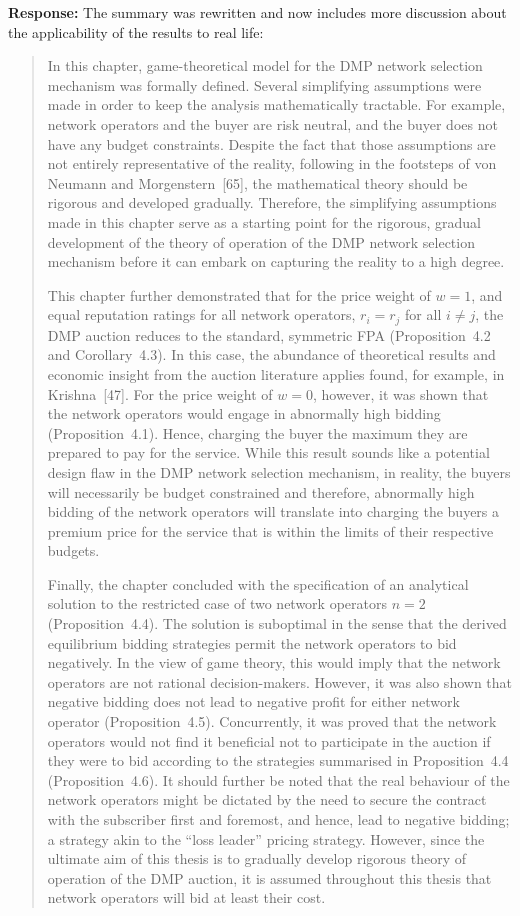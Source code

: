 \documentclass[10pt,a4paper,notitlepage]{article}
\numberwithin{equation}{section}
\begin{document}
\textbf{Response:}
The summary was rewritten and now includes more discussion about the applicability of the results to real life:
\begin{quote}
In this chapter, game-theoretical model for the DMP network selection mechanism was formally defined. Several simplifying assumptions were made in order to keep the analysis mathematically tractable. For example, network operators and the buyer are risk neutral, and the buyer does not have any budget constraints. Despite the fact that those assumptions are not entirely representative of the reality, following in the footsteps of von Neumann and Morgenstern~[65], the mathematical theory should be rigorous and developed gradually. Therefore, the simplifying assumptions made in this chapter serve as a starting point for the rigorous, gradual development of the theory of operation of the DMP network selection mechanism before it can embark on capturing the reality to a high degree.

This chapter further demonstrated that for the price weight of $w=1$, and equal reputation ratings for all network operators, $r_i=r_j$ for all $i\neq j$, the DMP auction reduces to the standard, symmetric FPA (Proposition~4.2 and Corollary~4.3). In this case, the abundance of theoretical results and economic insight from the auction literature applies found, for example, in Krishna~[47]. For the price weight of $w=0$, however, it was shown that the network operators would engage in abnormally high bidding (Proposition~4.1). Hence, charging the buyer the maximum they are prepared to pay for the service. While this result sounds like a potential design flaw in the DMP network selection mechanism, in reality, the buyers will necessarily be budget constrained and therefore, abnormally high bidding of the network operators will translate into charging the buyers a premium price for the service that is within the limits of their respective budgets.

Finally, the chapter concluded with the specification of an analytical solution to the restricted case of two network operators $n=2$ (Proposition~4.4). The solution is suboptimal in the sense that the derived equilibrium bidding strategies permit the network operators to bid negatively. In the view of game theory, this would imply that the network operators are not rational decision-makers. However, it was also shown that negative bidding does not lead to negative profit for either network operator (Proposition~4.5). Concurrently, it was proved that the network operators would not find it beneficial not to participate in the auction if they were to bid according to the strategies summarised in Proposition~4.4 (Proposition~4.6). It should further be noted that the real behaviour of the network operators might be dictated by the need to secure the contract with the subscriber first and foremost, and hence, lead to negative bidding; a strategy akin to the ``loss leader'' pricing strategy. However, since the ultimate aim of this thesis is to gradually develop rigorous theory of operation of the DMP auction, it is assumed throughout this thesis that network operators will bid at least their cost.
\end{quote}
\end{document}
